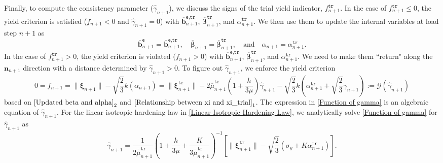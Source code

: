 \documentclass[preprint,11pt]{elsarticle}
\theoremstyle{definition}
\begin{document}
Finally, to compute the consistency parameter ($\widehat{\gamma}_{n+1}$), we discuss the signs of the trial yield indicator, $f_{n+1}^\texttt{tr}$. In the case of $f_{n+1}^\texttt{tr} \leq 0$, the yield criterion is satisfied ($f_{n+1} < 0$ and $\widehat{\gamma}_{n+1} = 0$) with $\overline{\mathbf{b}}_{n+1}^\texttt{e,tr}$, $\overline{\boldsymbol{\beta}}_{n+1}^\texttt{tr}$, and $\alpha_{n+1}^\texttt{tr}$. We then use them to update the internal variables at load step $n+1$ as
\begin{equation*}
    \overline{\mathbf{b}}_{n+1}^\texttt{e} = \overline{\mathbf{b}}_{n+1}^\texttt{e,tr}, \quad
    \overline{\boldsymbol{\beta}}_{n+1} = \overline{\boldsymbol{\beta}}_{n+1}^\texttt{tr},
    \quad \text{and} \quad
    \alpha_{n+1} = \alpha_{n+1}^\texttt{tr}.
\end{equation*}
In the case of $f_{n+1}^\texttt{tr} > 0$, the yield criterion is violated ($f_{n+1} > 0$) with $\overline{\mathbf{b}}_{n+1}^\texttt{e,tr}$, $\overline{\boldsymbol{\beta}}_{n+1}^\texttt{tr}$, and $\alpha_{n+1}^\texttt{tr}$. We need to make them ``return" along the $\mathbf{n}_{n+1}$ direction with a distance determined by $\widehat{\gamma}_{n+1} > 0$. To figure out $\widehat{\gamma}_{n+1}$, we enforce the yield criterion
\begin{equation} \label{Function of gamma}
    0 = f_{n+1} = \lVert \boldsymbol{\xi}_{n+1} \rVert - \sqrt{\dfrac{2}{3}} k (\alpha_{n+1})
    = \lVert \boldsymbol{\xi}_{n+1}^\texttt{tr} \rVert
    - 2 \overline{\overline{\mu}}_{n+1}^\texttt{tr}
    \left( 1 + \dfrac{h}{3\mu} \right) \widehat{\gamma}_{n+1}
    - \sqrt{\dfrac{2}{3}} k \left( \alpha_{n+1}^\texttt{tr} + \sqrt{\dfrac{2}{3}} \widehat{\gamma}_{n+1} \right) := \mathcal{G}(\widehat{\gamma}_{n+1})
\end{equation}
based on $\eqref{Updated beta and alpha}_2$ and $\eqref{Relationship between xi and xi_trial}_1$. The expression in \eqref{Function of gamma} is an algebraic equation of $\widehat{\gamma}_{n+1}$. For the linear isotropic hardening law in \eqref{Linear Isotropic Hardening Law}, we analytically solve \eqref{Function of gamma} for $\widehat{\gamma}_{n+1}$ as
\begin{equation} \label{Linear Solution of gamma}
    \widehat{\gamma}_{n+1} =
    \dfrac{1}{2 \overline{\overline{\mu}}_{n+1}^\texttt{tr}}
    \left( 1 + \dfrac{h}{3\mu} + \dfrac{K}{3 \overline{\overline{\mu}}_{n+1}^\texttt{tr}} \right)^{-1}
    \left[ \lVert \boldsymbol{\xi}_{n+1}^\texttt{tr} \rVert - \sqrt{\dfrac{2}{3}} (\sigma_y + K \alpha_{n+1}^\texttt{tr}) \right].
\end{equation}
\end{document}
